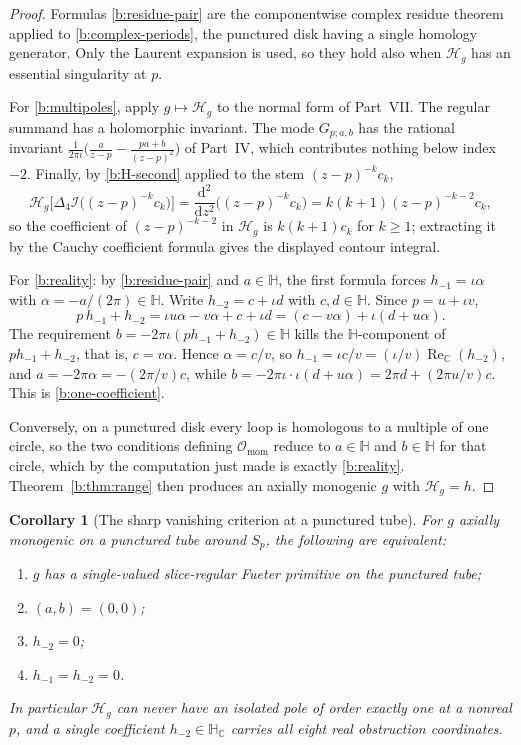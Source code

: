 \documentclass[11pt,a4paper]{article}
\numberwithin{equation}{section}
\newtheorem{corollary}[theorem]{Corollary}
\theoremstyle{definition}
\theoremstyle{remark}
\theoremstyle{plain}
\newcommand{\HH}{\mathbb H}
\newcommand{\HC}{\mathbb H_{\mathbb C}}
\newcommand{\CC}{\mathbb C}
\DeclareMathOperator{\Rea}{Re}
\newcommand{\ReC}{\Rea_{\CC}}
\newcommand{\lap}{\Delta_4}
\newcommand{\I}{\mathcal I}
\newcommand{\Omom}{\mathcal O_{\mathrm{mom}}}
\newcommand{\Sp}{S_{p}}
\newcommand{\Hg}{\mathcal H_{g}}      %
\newcommand{\dd}{\mathrm d}
\begin{document}
\begin{proof}
Formulas \eqref{b:residue-pair} are the componentwise complex residue theorem
applied to \eqref{b:complex-periods}, the punctured disk having a single
homology generator.  Only the Laurent expansion is used, so they hold also
when $\Hg$ has an essential singularity at $p$.

For \eqref{b:multipoles}, apply $g\mapsto\Hg$ to the normal form of Part~VII.
The regular summand has a holomorphic invariant.  The mode $G_{p;a,b}$ has
the rational invariant
$\frac{1}{2\pi\iota}\bigl(\frac{a}{z-p}-\frac{pa+b}{(z-p)^2}\bigr)$ of
Part~IV, which contributes nothing below index $-2$.  Finally, by
\eqref{b:H-second} applied to the stem $(z-p)^{-k}c_k$,
\[
 \Hg\bigl[\lap\I\bigl((z-p)^{-k}c_k\bigr)\bigr]
 =\frac{\dd^2}{\dd z^2}\bigl((z-p)^{-k}c_k\bigr)
 =k(k+1)(z-p)^{-k-2}c_k ,
\]
so the coefficient of $(z-p)^{-k-2}$ in $\Hg$ is $k(k+1)c_k$ for $k\ge1$;
extracting it by the Cauchy coefficient formula gives the displayed contour
integral.

For \eqref{b:reality}: by \eqref{b:residue-pair} and $a\in\HH$, the first
formula forces $h_{-1}=\iota\alpha$ with $\alpha=-a/(2\pi)\in\HH$.  Write
$h_{-2}=c+\iota d$ with $c,d\in\HH$.  Since $p=u+\iota v$,
\[
 p\,h_{-1}+h_{-2}=\iota u\alpha-v\alpha+c+\iota d
 =(c-v\alpha)+\iota(d+u\alpha).
\]
The requirement $b=-2\pi\iota(p h_{-1}+h_{-2})\in\HH$ kills the
$\HH$-component of $p h_{-1}+h_{-2}$, that is, $c=v\alpha$.  Hence
$\alpha=c/v$, so $h_{-1}=\iota c/v=(\iota/v)\ReC(h_{-2})$, and
$a=-2\pi\alpha=-(2\pi/v)c$, while
$b=-2\pi\iota\cdot\iota(d+u\alpha)=2\pi d+(2\pi u/v)c$.  This is
\eqref{b:one-coefficient}.

Conversely, on a punctured disk every loop is homologous to a multiple of one
circle, so the two conditions defining $\Omom$ reduce to
$a\in\HH$ and $b\in\HH$ for that circle, which by the computation just made is
exactly \eqref{b:reality}.  Theorem~\ref{b:thm:range} then produces an
axially monogenic $g$ with $\Hg=h$.
\end{proof}

\begin{corollary}[The sharp vanishing criterion at a punctured tube]
\label{b:cor:h2}
For $g$ axially monogenic on a punctured tube around $\Sp$, the following are
equivalent:
\begin{enumerate}[label=\textup{(\roman*)}]
\item $g$ has a single-valued slice-regular Fueter primitive on the punctured
tube;
\item $(a,b)=(0,0)$;
\item $h_{-2}=0$;
\item $h_{-1}=h_{-2}=0$.
\end{enumerate}
In particular $\Hg$ can never have an isolated pole of order exactly one at a
nonreal $p$, and a single coefficient $h_{-2}\in\HC$ carries all eight real
obstruction coordinates.
\end{corollary}
\end{document}
